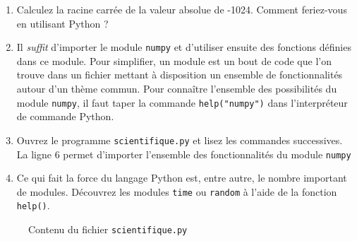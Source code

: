 \begin{enumerate}
\item Calculez la racine carrée de la valeur absolue de -1024.
  Comment feriez-vous en utilisant Python ? 

\item Il \textit{suffit} d'importer le module \texttt{numpy} et d'utiliser ensuite
  des fonctions définies dans ce module.
  Pour simplifier, un module est un bout de code que l'on trouve dans un fichier
  mettant à disposition un ensemble de fonctionnalités autour d'un thème commun.
  Pour connaître l'ensemble des possibilités du module \texttt{numpy}, il faut taper la commande
  \texttt{help("numpy")} dans l'interpréteur de commande Python.


\item Ouvrez le programme \texttt{scientifique.py} et lisez les commandes successives.
  La ligne 6 permet d'importer l'ensemble des fonctionnalités du module \texttt{numpy}

\item Ce qui fait la force du langage Python est, entre autre, le nombre important de modules.
  Découvrez les modules \texttt{time} ou \texttt{random} à l'aide de la fonction \texttt{help()}.


\end{enumerate}

\begin{figure}  
  
  \caption{Contenu du fichier \texttt{scientifique.py}}
  \label{polynome_scientifique}
\end{figure}



